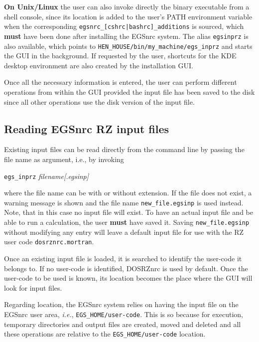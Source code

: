 \documentclass[12pt,twoside]{article}   %
\newcommand{\ie}{{\em i.e.}}
\begin{document}
{\bf On Unix/Linux} the user can also invoke directly the binary executable from a shell console,
since its location is added to the user's PATH environment variable when the corresponding
{\tt egsnrc\_[cshrc|bashrc]\_additions} is sourced, which {\bf must} have been done after
installing the EGSnrc system.
The alias {\tt egsinprz} is
also available, which points to {\tt HEN\_HOUSE/bin/my\_machine/egs\_inprz} and starts the GUI
in the background.
If requested by the user, shortcuts for the KDE desktop environment are also created by the
installation GUI.

Once all the necessary information is entered, the user can perform different operations
from within the GUI provided the input file has been saved to the disk since all other
operations use the disk version of the input file.


\subsection{Reading EGSnrc RZ input files}
\label{reading}

Existing input files can be read directly from the command line by passing the file name as
argument, i.e., by invoking

        {\tt egs\_inprz} {\em filename[.egsinp]}

\noindent
where the file name can be with or without extension. If the file does not exist, a warning
message is shown and the file name {\tt new\_file.egsinp} is used instead. Note, that in this
case no input file will exist. To have an actual input file and be able to run a calculation,
the user {\bf must} have saved it. Saving {\tt new\_file.egsinp} without modifying any entry
will leave a default input file for use with the RZ user code {\tt dosrznrc.mortran}.

Once an existing input file is loaded, it is
searched to identify the user-code it belongs to. If no user-code is identified,
DOSRZnrc is used by default. Once the user-code to be used is known, its location
becomes the place where the GUI will look for input files.

Regarding location, the EGSnrc system relies on having the input file on the EGSnrc
user area, \ie, {\tt EGS\_HOME/user-code}. This is so because for execution,
temporary directories and output files are created, moved and deleted and all these
operations are relative to the {\tt EGS\_HOME/user-code} location.
\end{document}
